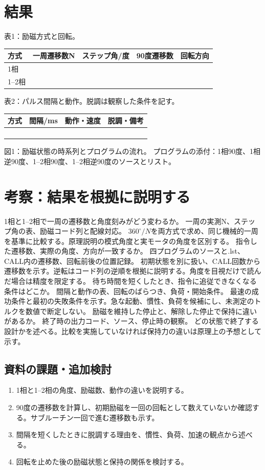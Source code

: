 \documentclass[lualatex,a4paper,10pt]{jlreq}
\begin{document}
\section{結果}\label{sec:auto5}
表1：励磁方式と回転。
\par\noindent\begin{tabularx}{\linewidth}{YYYYY}
\toprule 方式 & 一周遷移数N & ステップ角/度 & 90度遷移数 & 回転方向\\\midrule
1相&&&&\\1--2相&&&&\\\bottomrule
\end{tabularx}
表2：パルス間隔と動作。脱調は観察した条件を記す。
\par\noindent\begin{tabularx}{\linewidth}{YYYY}
\toprule 方式 & 間隔/ms & 動作・速度 & 脱調・備考\\\midrule
&&&\\&&&\\&&&\\&&&\\\bottomrule
\end{tabularx}
図1：励磁状態の時系列とプログラムの流れ。
\writing{35mm}
プログラムの添付：1相90度、1相逆90度、1--2相90度、1--2相逆90度のソースとリスト。
\writing{20mm}
\clearpage
\clearpage\section{考察：結果を根拠に説明する}\label{sec:auto6}
{1相と1--2相で一周の遷移数と角度刻みがどう変わるか。}
{一周の実測N、ステップ角の表、励磁コード列と配線対応。}
{$360^\circ/N$を両方式で求め、同じ機械的一周を基準に比較する。原理説明の模式角度と実モータの角度を区別する。}
{指令した遷移数、実際の角度、方向が一致するか。}
{四プログラムのソースと.lst、CALL内の遷移数、回転前後の位置記録。}
{初期状態を別に扱い、CALL回数から遷移数を示す。逆転はコード列の逆順を根拠に説明する。角度を目視だけで読んだ場合は精度を限定する。}
{待ち時間を短くしたとき、指令に追従できなくなる条件はどこか。}
{間隔と動作の表、回転のばらつき、負荷・開始条件。}
{最速の成功条件と最初の失敗条件を示す。急な起動、慣性、負荷を候補にし、未測定のトルクを数値で断定しない。}
{励磁を維持した停止と、解除した停止で保持に違いがあるか。}
{終了時の出力コード、ソース、停止時の観察。}
{どの状態で終了する設計かを述べる。比較を実施していなければ保持力の違いは原理上の予想として示す。}
\subsection{資料の課題・追加検討}
\begin{enumerate}
\item 1相と1--2相の角度、励磁数、動作の違いを説明する。
\item 90度の遷移数を計算し、初期励磁を一回の回転として数えていないか確認する。サブルーチン一回で進む遷移数も示す。
\item 間隔を短くしたときに脱調する理由を、慣性、負荷、加速の観点から述べる。
\item 回転を止めた後の励磁状態と保持の関係を検討する。
\end{enumerate}
\writing{30mm}
\end{document}
